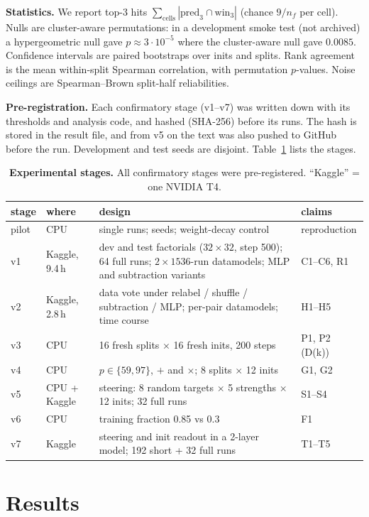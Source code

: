 \documentclass[10pt]{article}
\newcommand{\Dk}{D(k)}
\begin{document}
\textbf{Statistics.} We report top-3 hits $\sum_{\text{cells}}|\text{pred}_3\cap\text{win}_3|$ (chance $9/n_f$ per cell).
Nulls are cluster-aware permutations: in a development smoke test (not archived) a hypergeometric null gave $p\approx3\cdot10^{-5}$ where the cluster-aware null
gave $0.0085$.
Confidence intervals are paired bootstraps over inits and splits. Rank agreement is the mean within-split Spearman
correlation, with permutation $p$-values. Noise ceilings are Spearman--Brown split-half reliabilities.

\textbf{Pre-registration.} Each confirmatory stage (v1--v7) was written down with its thresholds and analysis code, and
hashed (SHA-256) before its runs. The hash is stored in the result file, and from v5 on the text was also pushed to
GitHub before the run. Development and test seeds are disjoint. Table~\ref{tab:runs} lists the stages.

\begin{table}[t]\centering\small
\caption{\textbf{Experimental stages.} All confirmatory stages were pre-registered. ``Kaggle'' = one NVIDIA T4.}
\label{tab:runs}
\begin{tabularx}{\linewidth}{@{}l l X l@{}}\toprule
stage & where & design & claims \\\midrule
pilot & CPU & single runs; seeds; weight-decay control & reproduction \\
v1 & Kaggle, 9.4\,h & dev and test factorials ($32\times32$, step 500); 64 full runs; $2\times1536$-run datamodels; MLP and subtraction variants & C1--C6, R1 \\
v2 & Kaggle, 2.8\,h & data vote under relabel / shuffle / subtraction / MLP; per-pair datamodels; time course & H1--H5 \\
v3 & CPU & 16 fresh splits $\times$ 16 fresh inits, 200 steps & P1, P2 (\Dk) \\
v4 & CPU & $p\in\{59,97\}$, $+$ and $\times$; 8 splits $\times$ 12 inits & G1, G2 \\
v5 & CPU + Kaggle & steering: 8 random targets $\times$ 5 strengths $\times$ 12 inits; 32 full runs & S1--S4 \\
v6 & CPU & training fraction 0.85 vs 0.3 & F1 \\
v7 & Kaggle & steering and init readout in a 2-layer model; 192 short + 32 full runs & T1--T5 \\\bottomrule
\end{tabularx}
\end{table}

\section{Results}
\end{document}

